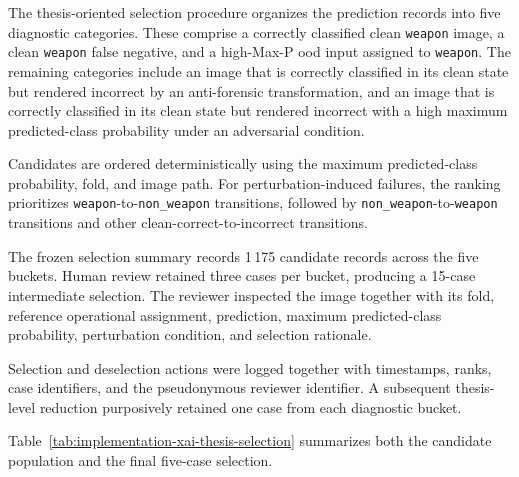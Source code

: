 The thesis-oriented selection procedure organizes the prediction records into
five diagnostic categories. These comprise a correctly classified clean
\texttt{weapon} image, a clean \texttt{weapon} false negative, and a
high-Max-P \gls{ood} input assigned to \texttt{weapon}. The remaining
categories include an image that is correctly classified in its clean state but
rendered incorrect by an anti-forensic transformation, and an image that is
correctly classified in its clean state but rendered incorrect with a high
maximum predicted-class probability under an adversarial condition.




Candidates are ordered deterministically using the maximum predicted-class
probability, fold, and image path. For perturbation-induced failures, the
ranking prioritizes \texttt{weapon}-to-\texttt{non\_weapon} transitions,
followed by \texttt{non\_weapon}-to-\texttt{weapon} transitions and other
clean-correct-to-incorrect transitions.

The frozen selection summary records 1\,175 candidate records across the five
buckets. Human review retained three cases per bucket, producing a 15-case
intermediate selection. The reviewer inspected the image together with its
fold, reference operational assignment, prediction, maximum predicted-class
probability, perturbation condition, and selection rationale.

Selection and deselection actions were logged together with timestamps, ranks,
case identifiers, and the pseudonymous reviewer identifier. A subsequent
thesis-level reduction purposively retained one case from each
diagnostic bucket.

Table~\ref{tab:implementation-xai-thesis-selection} summarizes both the
candidate population and the final five-case selection.

